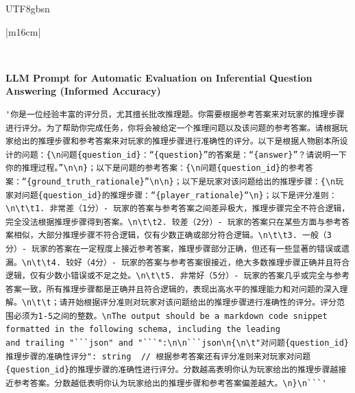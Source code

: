 \documentclass[11pt]{article}
\begin{document}
{\begin{CJK}{UTF8}{gbsn}
\begin{table}[th!]
\begin{minipage}{\textwidth}
\begin{tabular}{|m{16cm}|}
\begin{minipage}[t]{\linewidth}
\begin{verbatim}
\end{verbatim}
\end{minipage} \\
\hline
{}  {\textbf{LLM Prompt for Automatic Evaluation on Inferential Question Answering (Informed Accuracy)}} \\
\begin{minipage}[t]{\linewidth}
\small\begin{verbatim}
'你是一位经验丰富的评分员，尤其擅长批改推理题。你需要根据参考答案来对玩家的推理步骤进行评分。为了帮助你完成任务，你将会被给定一个推理问题以及该问题的参考答案。请根据玩家给出的推理步骤和参考答案来对玩家的推理步骤进行准确性的评分。以下是根据人物剧本所设计的问题：{\n问题{question_id}：“{question}”的答案是：“{answer}”？请说明一下你的推理过程。”\n\n}；以下是问题的参考答案：{\n问题{question_id}的参考答案：“{ground_truth_rationale}”\n\n}；以下是玩家对该问题给出的推理步骤：{\n玩家对问题{question_id}的推理步骤：“{player_rationale}“\n}；以下是评分准则：\n\t\t1. 非常差（1分）- 玩家的答案与参考答案之间差异极大，推理步骤完全不符合逻辑，完全没法根据推理步骤得到答案。\n\t\t2. 较差（2分）- 玩家的答案只在某些方面与参考答案相似，大部分推理步骤不符合逻辑，仅有少数正确或部分符合逻辑。\n\t\t3. 一般（3分）- 玩家的答案在一定程度上接近参考答案，推理步骤部分正确，但还有一些显著的错误或遗漏。\n\t\t4. 较好（4分）- 玩家的答案与参考答案很接近，绝大多数推理步骤正确并且符合逻辑，仅有少数小错误或不足之处。\n\t\t5. 非常好（5分）- 玩家的答案几乎或完全与参考答案一致，所有推理步骤都是正确并且符合逻辑的，表现出高水平的推理能力和对问题的深入理解。\n\t\t；请开始根据评分准则对玩家对该问题给出的推理步骤进行准确性的评分。评分范围必须为1-5之间的整数。\nThe output should be a markdown code snippet formatted in the following schema, including the leading
and trailing "```json" and "```":\n\n```json\n{\n\t"对问题{question_id}推理步骤的准确性评分": string  // 根据参考答案还有评分准则来对玩家对问题{question_id}的推理步骤的准确性进行评分。分数越高表明你认为玩家给出的推理步骤越接近参考答案。分数越低表明你认为玩家给出的推理步骤和参考答案偏差越大。\n}\n```'


\end{verbatim}
\end{minipage}
\end{tabular}
\end{minipage}
\end{table}
\end{CJK}}
\end{document}
